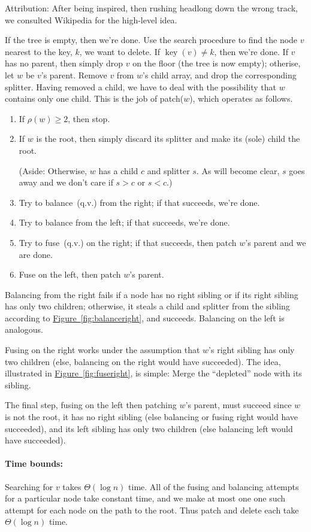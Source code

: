\documentclass[a4paper]{article}
\DeclareMathOperator{\key}{key}
\newcommand*{\figref}[1]{\hyperref[#1]{Figure~\ref*{#1}}}
\begin{document}
Attribution:
After being inspired, then rushing headlong down the wrong track, we consulted Wikipedia for the high-level idea.

If the tree is empty, then we're done.
Use the search procedure to find the node $v$ nearest to the key, $k$, we want to delete.
If $\key(v) \not= k$, then we're done.
If $v$ has no parent, then simply drop $v$ on the floor (the tree is now empty); otherise, let $w$ be $v$'s parent.
Remove $v$ from $w$'s child array, and drop the corresponding splitter.
Having removed a child, we have to deal with the possibility that $w$ contains only one child.
This is the job of patch($w$), which operates as follows.
\begin{enumerate}
\item If $\rho(w) \ge 2$, then stop.
\item If $w$ is the root, then simply discard its splitter and make its (sole) child the root.

(Aside:
Otherwise, $w$ has a child $c$ and splitter $s$.
As will become clear, $s$ goes away and we don't care if $s > c$ or $s < c$.)

\item Try to balance~(q.v.) from the right; if that succeeds, we're done.
\item Try to balance from the left; if that succeeds, we're done.
\item Try to fuse~(q.v.) on the right; if that succeeds, then patch $w$'s parent and we are done.
\item Fuse on the left, then patch $w$'s parent.
\end{enumerate}
Balancing from the right fails if a node has no right sibling or if its right sibling has only two children; otherwise, it steals a child and splitter from the sibling according to \figref{fig:balanceright}, and succeeds.
Balancing on the left is analogous.

Fusing on the right works under the assumption that $w$'s right sibling has only two children (else, balancing on the right would have succeeded).
The idea, illustrated in \figref{fig:fuseright}, is simple:
Merge the ``depleted'' node with its sibling.

The final step, fusing on the left then patching $w$'s parent, must succeed since $w$ is not the root, it has no right sibling (else balancing or fusing right would have succeeded), and its left sibling has only two children (else balancing left would have succeeded).

\paragraph{Time bounds:}
Searching for $v$ takes $\Theta(\log n)$ time.
All of the fusing and balancing attempts for a particular node take constant time, and we make at most one one such attempt for each node on the path to the root.
Thus patch and delete each take $\Theta(\log n)$ time.
\end{document}
